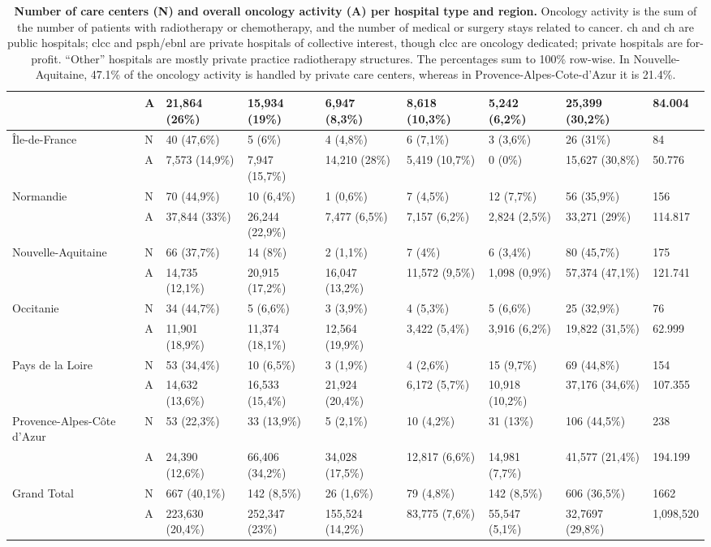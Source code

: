 \begin{table}[H]
{\begin{tabular}{|l|l|l|l|l|l|l|l|l|}
        ~ & A & 21,864 (26\%) & 15,934 (19\%) & 6,947 (8,3\%) & 8,618 (10,3\%) & 5,242 (6,2\%) & 25,399 (30,2\%) & 84.004 \\ \hline
        Île-de-France & N & 40 (47,6\%) & 5 (6\%) & 4 (4,8\%) & 6 (7,1\%) & 3 (3,6\%) & 26 (31\%) & 84 \\
        ~ & A & 7,573 (14,9\%) & 7,947 (15,7\%) & 14,210 (28\%) & 5,419 (10,7\%) & 0 (0\%) & 15,627 (30,8\%) & 50.776 \\ \hline
        Normandie & N & 70 (44,9\%) & 10 (6,4\%) & 1 (0,6\%) & 7 (4,5\%) & 12 (7,7\%) & 56 (35,9\%) & 156 \\
        ~ & A & 37,844 (33\%) & 26,244 (22,9\%) & 7,477 (6,5\%) & 7,157 (6,2\%) & 2,824 (2,5\%) & 33,271 (29\%) & 114.817 \\ \hline
        Nouvelle-Aquitaine & N & 66 (37,7\%) & 14 (8\%) & 2 (1,1\%) & 7 (4\%) & 6 (3,4\%) & 80 (45,7\%) & 175 \\
        ~ & A & 14,735 (12,1\%) & 20,915 (17,2\%) & 16,047 (13,2\%) & 11,572 (9,5\%) & 1,098 (0,9\%) & 57,374 (47,1\%) & 121.741 \\ \hline
        Occitanie & N & 34 (44,7\%) & 5 (6,6\%) & 3 (3,9\%) & 4 (5,3\%) & 5 (6,6\%) & 25 (32,9\%) & 76 \\
        ~ & A & 11,901 (18,9\%) & 11,374 (18,1\%) & 12,564 (19,9\%) & 3,422 (5,4\%) & 3,916 (6,2\%) & 19,822 (31,5\%) & 62.999 \\ \hline
        Pays de la Loire & N & 53 (34,4\%) & 10 (6,5\%) & 3 (1,9\%) & 4 (2,6\%) & 15 (9,7\%) & 69 (44,8\%) & 154 \\
        ~ & A & 14,632 (13,6\%) & 16,533 (15,4\%) & 21,924 (20,4\%) & 6,172 (5,7\%) & 10,918 (10,2\%) & 37,176 (34,6\%) & 107.355 \\ \hline
        Provence-Alpes-Côte d'Azur & N & 53 (22,3\%) & 33 (13,9\%) & 5 (2,1\%) & 10 (4,2\%) & 31 (13\%) & 106 (44,5\%) & 238 \\
        ~ & A & 24,390 (12,6\%) & 66,406 (34,2\%) & 34,028 (17,5\%) & 12,817 (6,6\%) & 14,981 (7,7\%) & 41,577 (21,4\%) & 194.199 \\ \hline
        Grand Total & N & 667 (40,1\%) & 142 (8,5\%) & 26 (1,6\%) & 79 (4,8\%) & 142 (8,5\%) & 606 (36,5\%) & 1662 \\
        ~ & A & 223,630 (20,4\%) & 252,347 (23\%) & 155,524 (14,2\%) & 83,775 (7,6\%) & 55,547 (5,1\%) & 32,7697 (29,8\%) & 1,098,520 \\ \hline
    \end{tabular}}
    \caption{
        \textbf{Number of care centers (N) and overall oncology activity (A) per hospital type and region.} Oncology activity is the sum of the number of patients with radiotherapy or chemotherapy, and the number of medical or surgery stays related to cancer. \ac{ch} and \ac{ch} are public hospitals; \ac{clcc} and \ac{psph}/\ac{ebnl} are private hospitals of collective interest, though \acs{clcc} are oncology dedicated; private hospitals are for-profit. “Other” hospitals are mostly private practice radiotherapy structures. The percentages sum to 100\% row-wise. In Nouvelle-Aquitaine, 47.1\% of the oncology activity is handled by private care centers, whereas in Provence-Alpes-Cote-d’Azur it is 21.4\%.
}
\end{table}
